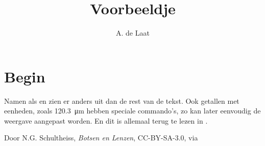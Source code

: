

\title{Voorbeeldje}
\author{A. de Laat}



\maketitle

\section{Begin}

Namen als \hisparc en \jsparc zien er anders uit dan de rest van de tekst.
Ook getallen met eenheden, zoals \SI{120.3}{\micro\meter} hebben speciale
commando's, zo kan later eenvoudig de weergave aangepast worden. En dit
is allemaal terug te lezen in \cite{tekst}.

\begin{thebibliography}{9}
        Door N.G. Schultheiss, \emph{Botsen en Lenzen}, CC-BY-SA-3.0, via \hisparc
\end{thebibliography}


